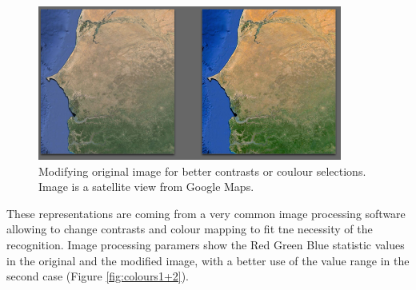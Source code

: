 \begin{figure}[hbtp]
\begin{center} 
\includegraphics[width=10cm]{SenegalSideBySide.png}
\caption{Modifying original image for better contrasts or coulour selections. Image is a satellite view from Google Maps.}
\label{fig:sideBySide}
\end{center}
\end{figure}

These representations are coming from a very common image processing software 
allowing to change contrasts and colour mapping to fit tne necessity of the recognition.
Image processing paramers show the Red Green Blue statistic values in the original
and the modified image, with a better use of the value range in the second case
(Figure \ref{fig:colours1+2}).



